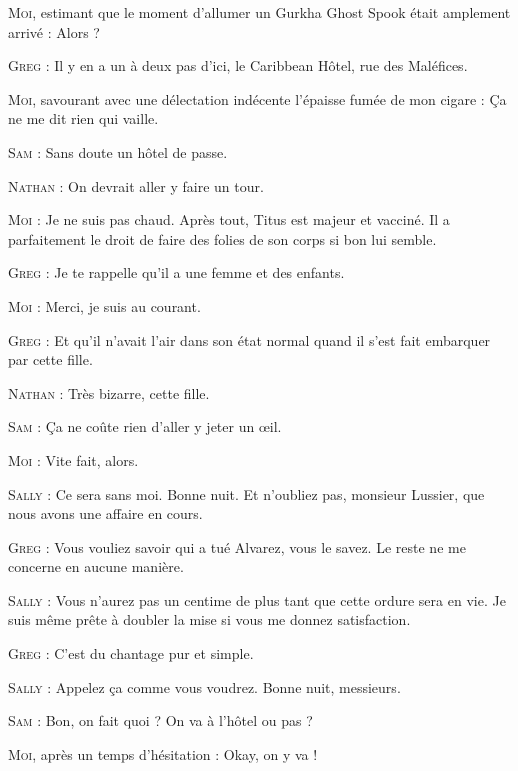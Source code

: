 \begin{dialogue}
\textsc{Moi}, estimant que le moment d’allumer un Gurkha Ghost Spook était amplement arrivé : Alors ?

\textsc{Greg} : Il y en a un à deux pas d’ici, le Caribbean Hôtel, rue des Maléfices.

\textsc{Moi}, savourant avec une délectation indécente l’épaisse fumée de mon cigare : Ça ne me dit rien qui vaille.

\textsc{Sam} : Sans doute un hôtel de passe.

\textsc{Nathan} : On devrait aller y faire un tour.

\textsc{Moi} : Je ne suis pas chaud. Après tout, Titus est majeur et vacciné. Il a parfaitement le droit de faire des folies de son corps si bon lui semble.

\textsc{Greg} : Je te rappelle qu’il a une femme et des enfants.

\textsc{Moi} : Merci, je suis au courant.

\textsc{Greg} : Et qu’il n’avait l’air dans son état normal quand il s’est fait embarquer par cette fille.

\textsc{Nathan} : Très bizarre, cette fille.

\textsc{Sam} : Ça ne coûte rien d’aller y jeter un œil.

\textsc{Moi} : Vite fait, alors.

\textsc{Sally} : Ce sera sans moi. Bonne nuit. Et n’oubliez pas, monsieur Lussier, que nous avons une affaire en cours.

\textsc{Greg} : Vous vouliez savoir qui a tué Alvarez, vous le savez. Le reste ne me concerne en aucune manière.

\textsc{Sally} : Vous n’aurez pas un centime de plus tant que cette ordure sera en vie. Je suis même prête à doubler la mise si vous me donnez satisfaction.

\textsc{Greg} : C’est du chantage pur et simple.

\textsc{Sally} : Appelez ça comme vous voudrez. Bonne nuit, messieurs.

\textsc{Sam} : Bon, on fait quoi ? On va à l’hôtel ou pas ?

\textsc{Moi}, après un temps d’hésitation : Okay, on y va !

\end{dialogue}

%
%

